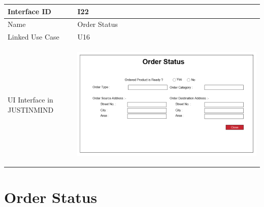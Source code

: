 \documentclass[12pt,a4paper]{report}
\begin{document}
\begin{tabular}{ | m{3cm} | m{12cm}| } \hline

Interface ID & I22  \\\hline

Name  & Order Status  \\ \hline

Linked Use Case &U16  \\ \hline

UI Interface in JUSTINMIND & \begin{center} \includegraphics[scale=0.3]{./UIs for Latex Reports/UI-023 OrderStatus@1x.png}\end{center}  \\ \hline

\end{tabular} 
\section{Order Status }
\end{document}
